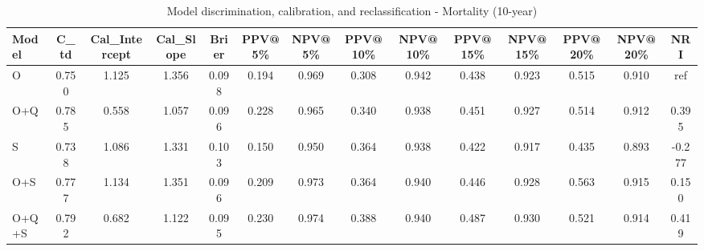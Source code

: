 \begin{table}[htbp]
\centering
\small
\caption{Model discrimination, calibration, and reclassification - Mortality (10-year)}
\label{tab:perf_mortality_10y}
\begin{tabular}{lccccccccccccc}
\toprule
Model & C\_td & Cal\_Intercept & Cal\_Slope & Brier & PPV@5\% & NPV@5\% & PPV@10\% & NPV@10\% & PPV@15\% & NPV@15\% & PPV@20\% & NPV@20\% & NRI \\
\midrule
O & 0.750 & 1.125 & 1.356 & 0.098 & 0.194 & 0.969 & 0.308 & 0.942 & 0.438 & 0.923 & 0.515 & 0.910 & ref \\
O+Q & 0.785 & 0.558 & 1.057 & 0.096 & 0.228 & 0.965 & 0.340 & 0.938 & 0.451 & 0.927 & 0.514 & 0.912 & 0.395 \\
S & 0.738 & 1.086 & 1.331 & 0.103 & 0.150 & 0.950 & 0.364 & 0.938 & 0.422 & 0.917 & 0.435 & 0.893 & -0.277 \\
O+S & 0.777 & 1.134 & 1.351 & 0.096 & 0.209 & 0.973 & 0.364 & 0.940 & 0.446 & 0.928 & 0.563 & 0.915 & 0.150 \\
O+Q+S & 0.792 & 0.682 & 1.122 & 0.095 & 0.230 & 0.974 & 0.388 & 0.940 & 0.487 & 0.930 & 0.521 & 0.914 & 0.419 \\
\bottomrule
\end{tabular}
\end{table}